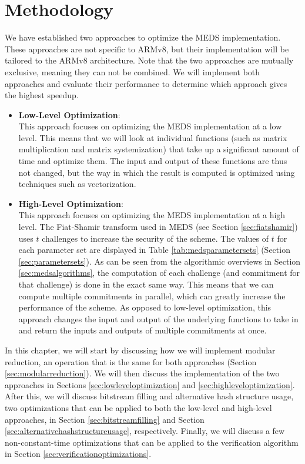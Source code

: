 \documentclass[11pt,a4paper]{report}
\theoremstyle{definition}
\begin{document}
\chapter{Methodology}
\label{ch:methodology}
We have established two approaches to optimize the MEDS implementation. These approaches are not specific to ARMv8, but their implementation will be tailored to the ARMv8 architecture. Note that the two approaches are mutually exclusive, meaning they can not be combined. We will implement both approaches and evaluate their performance to determine which approach gives the highest speedup.
\begin{itemize}
  \item \textbf{Low-Level Optimization}:\\
  This approach focuses on optimizing the MEDS implementation at a low level. This means that we will look at individual functions (such as matrix multiplication and matrix systemization) that take up a significant amount of time and optimize them. The input and output of these functions are thus not changed, but the way in which the result is computed is optimized using techniques such as vectorization.
  \item \textbf{High-Level Optimization}:\\
  This approach focuses on optimizing the MEDS implementation at a high level. The Fiat-Shamir transform used in MEDS (see Section \ref{sec:fiatshamir}) uses $t$ challenges to increase the security of the scheme. The values of $t$ for each parameter set are displayed in Table \ref{tab:medsparametersets} (Section \ref{sec:parametersets}). As can be seen from the algorithmic overviews in Section \ref{sec:medsalgorithms}, the computation of each challenge (and commitment for that challenge) is done in the exact same way. This means that we can compute multiple commitments in parallel, which can greatly increase the performance of the scheme. As opposed to low-level optimization, this approach changes the input and output of the underlying functions to take in and return the inputs and outputs of multiple commitments at once.
\end{itemize}
In this chapter, we will start by discussing how we will implement modular reduction, an operation that is the same for both approaches (Section \ref{sec:modularreduction}). We will then discuss the implementation of the two approaches in Sections \ref{sec:lowleveloptimization} and \ref{sec:highleveloptimization}. After this, we will discuss bitstream filling and alternative hash structure usage, two optimizations that can be applied to both the low-level and high-level approaches, in Section \ref{sec:bitstreamfilling} and Section \ref{sec:alternativehashstructureusage}, respectively. Finally, we will discuss a few non-constant-time optimizations that can be applied to the verification algorithm in Section \ref{sec:verificationoptimizations}.
\end{document}
